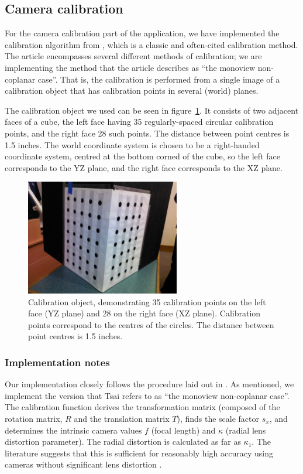 
\subsection{Camera calibration}
\label{sec:calibration}

For the camera calibration part of the application, we have
implemented the calibration algorithm from \cite{TSAI}, which is a
classic and often-cited calibration method. The article encompasses
several different methods of calibration; we are implementing the
method that the article describes as ``the monoview non-coplanar
case''. That is, the calibration is performed from a single image
of a calibration object that has calibration points in several (world)
planes.

The calibration object we used can be seen in figure~\ref{fig:calib-object}.
It consists of two adjacent faces of a cube, the left face having 35 regularly-spaced circular calibration points,
and the right face 28 such points. The distance between point centres is 1.5
inches. The world coordinate system is chosen to be a right-handed
coordinate system, centred at the bottom corned of the cube, so the
left face corresponds to the YZ plane, and the right face corresponds
to the XZ plane.

\begin{figure}[H]
  \centering
  \includegraphics[width=0.6\textwidth]{figures/calibration-object}
  \caption[Calibration object]{Calibration object, demonstrating 35 calibration points on the left face (YZ plane) and 28 on the right face (XZ plane). Calibration points correspond to the centres of the circles. The distance between point centres is 1.5 inches.}
  \label{fig:calib-object}
\end{figure}

\subsubsection{Implementation notes}
Our implementation closely follows the procedure laid out in
\cite{TSAI}. As mentioned, we implement the version that Tsai refers to
as ``the monoview non-coplanar case''. The calibration function derives
the transformation matrix (composed of the rotation matrix, $R$ and
the translation matrix $T$), finds the scale factor $s_x$, and determines the
intrinsic camera values $f$ (focal length) and $\kappa$ (radial
lens distortion parameter). The radial distortion is calculated as far as
$\kappa_1$. The literature suggests that this is sufficient for
reasonably high accuracy using cameras without significant lens
distortion \cite{algebraic-distortion}.

